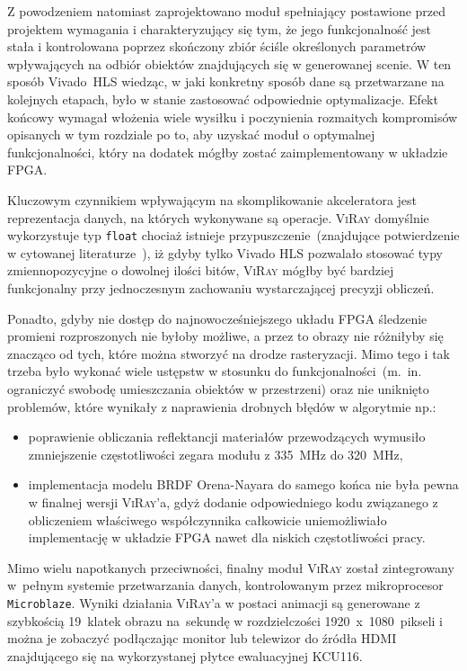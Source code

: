 Z powodzeniem natomiast zaprojektowano moduł spełniający postawione przed projektem wymagania i charakteryzujący się tym, że jego funkcjonalność jest stała i kontrolowana poprzez skończony zbiór ściśle określonych parametrów wpływających na odbiór obiektów znajdujących się w generowanej scenie. W ten sposób Vivado~HLS wiedząc, w jaki konkretny sposób dane są przetwarzane na kolejnych etapach, było w stanie zastosować odpowiednie optymalizacje. Efekt końcowy wymagał włożenia wiele wysiłku i poczynienia rozmaitych kompromisów opisanych w tym rozdziale po to, aby uzyskać moduł o optymalnej funkcjonalności, który na dodatek mógłby zostać zaimplementowany w układzie FPGA.

Kluczowym czynnikiem wpływającym na skomplikowanie akceleratora jest reprezentacja danych, na których wykonywane są operacje. \textsc{ViRay} domyślnie wykorzystuje typ \texttt{float} chociaż istnieje przypuszczenie~(znajdujące potwierdzenie w cytowanej literaturze~\cite{RPU}), iż gdyby tylko Vivado HLS pozwalało stosować typy zmiennopozycyjne o dowolnej ilości bitów, \textsc{ViRay} mógłby być bardziej funkcjonalny przy jednoczesnym zachowaniu wystarczającej precyzji obliczeń.

Ponadto, gdyby nie dostęp do najnowocześniejszego układu FPGA śledzenie promieni rozproszonych nie byłoby możliwe, a przez to obrazy nie różniłyby się znacząco od tych, które można stworzyć na drodze rasteryzacji. Mimo tego i tak trzeba było wykonać wiele ustępstw w stosunku do funkcjonalności~(m.~in. ograniczyć swobodę umieszczania obiektów w przestrzeni) oraz nie uniknięto problemów, które wynikały z naprawienia drobnych błędów w algorytmie np.:
\begin{itemize}
\item poprawienie obliczania reflektancji materiałów przewodzących wymusiło zmniejszenie częstotliwości zegara modułu z 335~MHz do 320~MHz,
\item implementacja modelu BRDF Orena-Nayara do samego końca nie była pewna w finalnej wersji \textsc{ViRay}'a, gdyż dodanie odpowiedniego kodu związanego z obliczeniem właściwego współczynnika całkowicie uniemożliwiało implementację w układzie FPGA nawet dla niskich częstotliwości pracy.
\end{itemize}

Mimo wielu napotkanych przeciwności, finalny moduł \textsc{ViRay} został zintegrowany w~pełnym systemie przetwarzania danych, kontrolowanym przez mikroprocesor \texttt{Microblaze}. Wyniki działania \textsc{ViRay}'a w postaci animacji są generowane z szybkością 19~klatek obrazu na~sekundę w rozdzielczości 1920~x~1080~pikseli i można je zobaczyć podłączając monitor lub telewizor do źródła HDMI znajdującego się na wykorzystanej płytce ewaluacyjnej KCU116.

